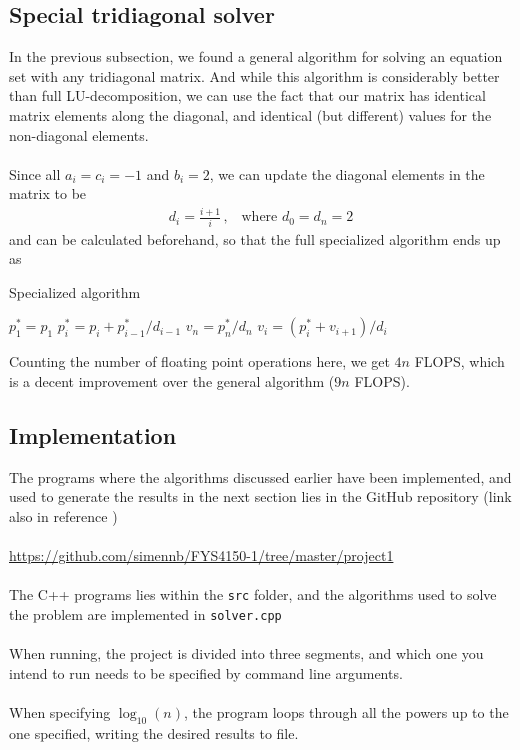 \documentclass{article}
\begin{document}
\subsection{Special tridiagonal solver}
In the previous subsection, we found a general algorithm for solving an equation set with any tridiagonal matrix. And while this algorithm is considerably better than full LU-decomposition, we can use the fact that our matrix has identical matrix elements along the diagonal, and identical (but different) values for the non-diagonal elements.\\\\
Since all $a_i = c_i = -1$ and $b_i = 2$, we can update the diagonal elements in the matrix to be
\begin{align*}
  d_i = \frac{i+1}{i}\,,\;\;\;\text{where }d_0 = d_n = 2
\end{align*}
and can be calculated beforehand, so that the full specialized algorithm ends up as
\begin{algorithm}[H]
\small
\caption{Specialized algorithm}\label{alg:tri_special}
\begin{algorithmic}[1]
\State $p_1^* = p_1$
 
\State $p_i^* = p_i + p_{i-1}^*/d_{i-1}$
\EndFor
\State $v_n = p_n^*/d_n$
 
\State $v_i = (p_i^* + v_{i+1})/d_i$ 
\EndFor
\end{algorithmic}
\end{algorithm}
Counting the number of floating point operations here, we get $4n$ FLOPS, which is a decent improvement over the general algorithm ($9n$ FLOPS).

\subsection{Implementation}
The programs where the algorithms discussed earlier have been implemented, and used to generate the results in the next section lies in the GitHub repository (link also in reference \cite{cite:github})\\\\\href{https://github.com/simennb/FYS4150-1/tree/master/project1}{https://github.com/simennb/FYS4150-1/tree/master/project1}\\\\
The C++ programs lies within the \texttt{src} folder, and the algorithms used to solve the problem are implemented in \texttt{solver.cpp}\\\\
When running, the project is divided into three segments, and which one you intend to run needs to be specified by command line arguments.\\\\
When specifying $\log_{10}(n)$, the program loops through all the powers up to the one specified, writing the desired results to file.
\end{document}
